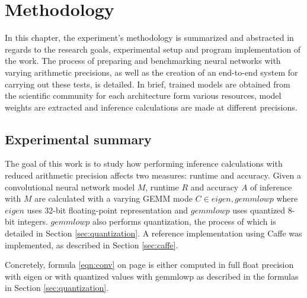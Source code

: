\chapter{Methodology}

In this chapter, the experiment's methodology is summarized and abstracted in regards to the research goals, experimental setup and program implementation of the work. The process of preparing and benchmarking neural networks with varying arithmetic precisions, as well as the creation of an end-to-end system for carrying out these tests, is detailed. In brief, trained models are obtained from the scientific community for each architecture form various resources, model weights are extracted and inference calculations are made at different precisions.

\section{Experimental summary}
The goal of this work is to study how performing inference calculations with reduced arithmetic precision affects two measures: runtime and accuracy. Given a convolutional neural network model $M$, runtime $R$ and accuracy $A$ of inference with $M$ are calculated with a varying GEMM mode $C \in{eigen, gemmlowp}$ where $eigen$ \cite{eigen} uses 32-bit floating-point representation and $gemmlowp$ \cite{gemmlowp} uses quantized 8-bit integers. $gemmlowp$ also performs quantization, the process of which is detailed in Section \ref{sec:quantization}. A reference implementation using Caffe \cite{caffe} was implemented, as described in Section \ref{sec:caffe}.

Concretely, formula \ref{eqn:conv} on page \pageref{eqn:conv} is either computed in full float precision with eigen or with quantized values with gemmlowp as described in the formulas in Section \ref{sec:quantization}.

